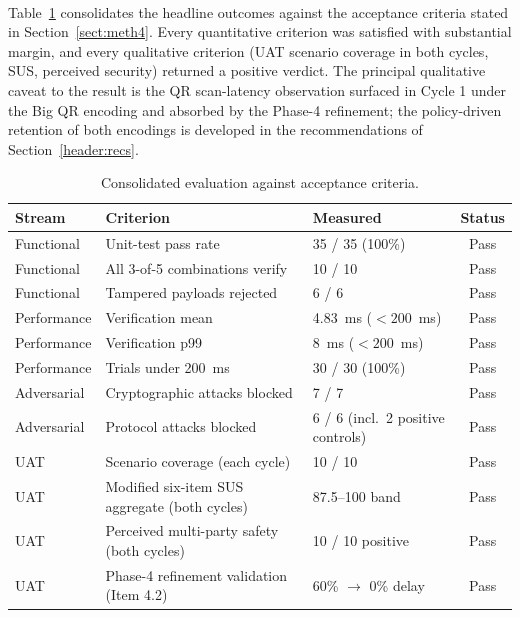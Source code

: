 \paragraph{}Table~\ref{tab:results-summary} consolidates the headline outcomes against the acceptance criteria stated in Section~\ref{sect:meth4}. Every quantitative criterion was satisfied with substantial margin, and every qualitative criterion (UAT scenario coverage in both cycles, SUS, perceived security) returned a positive verdict. The principal qualitative caveat to the result is the QR scan-latency observation surfaced in Cycle 1 under the Big QR encoding and absorbed by the Phase-4 refinement; the policy-driven retention of both encodings is developed in the recommendations of Section~\ref{header:recs}.

\begin{table}[H]
  \centering
  \caption{Consolidated evaluation against acceptance criteria.}
  \label{tab:results-summary}
  \begin{tabular}{|l|l|l|c|}
    \hline
    Stream & Criterion & Measured & Status \\\hline
    Functional & Unit-test pass rate & 35 / 35 (100\%) & Pass \\\hline
    Functional & All 3-of-5 combinations verify & 10 / 10 & Pass \\\hline
    Functional & Tampered payloads rejected & 6 / 6 & Pass \\\hline
    Performance & Verification mean & 4.83~ms ($< 200$~ms) & Pass \\\hline
    Performance & Verification p99 & 8~ms ($< 200$~ms) & Pass \\\hline
    Performance & Trials under 200~ms & 30 / 30 (100\%) & Pass \\\hline
    Adversarial & Cryptographic attacks blocked & 7 / 7 & Pass \\\hline
    Adversarial & Protocol attacks blocked & 6 / 6 (incl.\ 2 positive controls) & Pass \\\hline
    UAT & Scenario coverage (each cycle) & 10 / 10 & Pass \\\hline
    UAT & Modified six-item SUS aggregate (both cycles) & 87.5--100 band & Pass \\\hline
    UAT & Perceived multi-party safety (both cycles) & 10 / 10 positive & Pass \\\hline
    UAT & Phase-4 refinement validation (Item 4.2) & 60\% $\rightarrow$ 0\% delay & Pass \\\hline
  \end{tabular}
\end{table}
